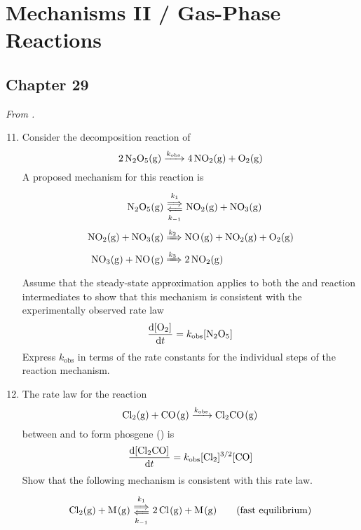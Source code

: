 \documentclass[../psets.tex]{subfiles}
\begin{document}
\section{Mechanisms II / Gas-Phase Reactions}
\subsection*{Chapter 29}
\emph{From \textcite{bib:McQuarrieSimon}.}
\begin{enumerate}[label={\textbf{29-\arabic*.}},leftmargin=3.5em]
    \setcounter{enumi}{10}
    \item {}Consider the decomposition reaction of 
    \begin{equation*}
        \ce{2N2O5(g) ->[$k_\text{obs}$] 4NO2(g) + O2(g)}
    \end{equation*}
    A proposed mechanism for this reaction is
    \begin{align*}
        \ce{N2O5(g)} &\Longleftrightarrows[k_1][k_{-1}] \ce{NO2(g) + NO3(g)}\\
        \ce{NO2(g) + NO3(g)} &\xRightarrow{k_2} \ce{NO(g) + NO2(g) + O2(g)}\\
        \ce{NO3(g) + NO(g)} &\xRightarrow{k_3} \ce{2NO2(g)}
    \end{align*}
    Assume that the steady-state approximation applies to both the  and  reaction intermediates to show that this mechanism is consistent with the experimentally observed rate law
    \begin{equation*}
        \dv{\cnc{O2}}{t} = k_\text{obs}\cnc{N2O5}
    \end{equation*}
    Express $k_\text{obs}$ in terms of the rate constants for the individual steps of the reaction mechanism.
    \item The rate law for the reaction
    \begin{equation*}
        \ce{Cl2(g) + CO(g) ->[$k_\text{obs}$] Cl2CO(g)}
    \end{equation*}
    between  and  to form phosgene () is
    \begin{equation*}
        \dv{\cnc{Cl2CO}}{t} = k_\text{obs}\cnc{Cl2}^{3/2}\cnc{CO}
    \end{equation*}
    Show that the following mechanism is consistent with this rate law.
    \begin{align*}
        \ce{Cl2(g) + M(g)} &\Longleftrightarrows[k_1][k_{-1}] \ce{2Cl(g) + M(g)}\tag{fast equilibrium}\\

\end{align*}
\end{enumerate}
\end{document}
